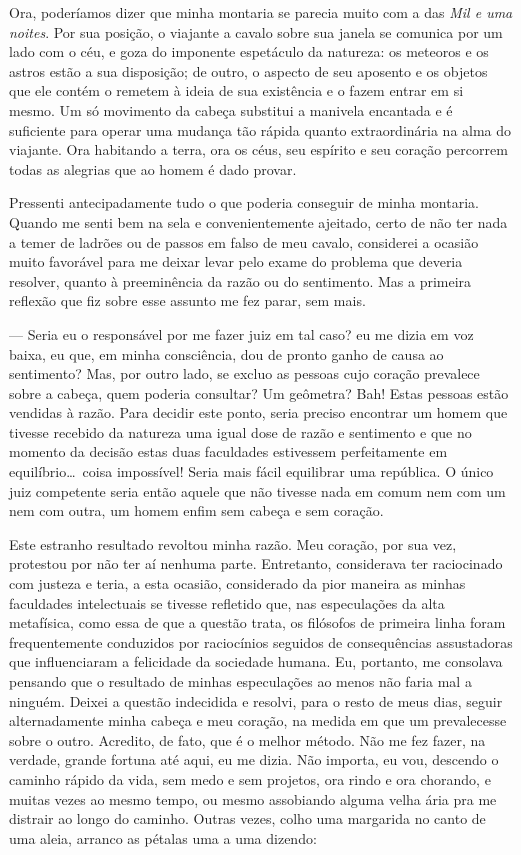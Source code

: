  Ora, poderíamos dizer que minha montaria se parecia muito com a das
\textit{Mil e uma noites}. Por sua posição, o viajante a cavalo sobre
sua janela se comunica por um lado com o céu, e goza do imponente
espetáculo da natureza: os meteoros e os astros estão a sua disposição;
de outro, o aspecto de seu aposento e os objetos que ele contém o
remetem à ideia de sua existência e o fazem entrar em si mesmo. Um só
movimento da cabeça substitui a manivela encantada e é suficiente para
operar uma mudança tão rápida quanto extraordinária na alma do
viajante. Ora habitando a terra, ora os céus, seu espírito e seu
coração percorrem todas as alegrias que ao homem é dado provar.

 Pressenti antecipadamente tudo o que poderia conseguir de minha
montaria. Quando me senti bem na sela e convenientemente ajeitado,
certo de não ter nada a temer de ladrões ou de passos em falso de meu
cavalo, considerei a ocasião muito favorável para me deixar levar pelo
exame do problema que deveria resolver, quanto à preeminência da razão
ou do sentimento. Mas a primeira reflexão que fiz sobre esse assunto me
fez parar, sem mais. 

--- Seria eu o responsável por me fazer juiz em tal caso? eu me dizia em
voz baixa, eu que, em minha consciência, dou de pronto ganho de causa
ao sentimento? Mas, por outro lado, se excluo as pessoas cujo coração
prevalece sobre a cabeça, quem poderia consultar? Um geômetra? Bah!
Estas pessoas estão vendidas à razão. Para decidir este ponto, seria
preciso encontrar um homem que tivesse recebido da natureza uma igual
dose de razão e sentimento e que no momento da decisão estas duas
faculdades estivessem perfeitamente em equilíbrio\ldots\ coisa impossível!
Seria mais fácil equilibrar uma república. O único juiz competente
seria então aquele que não tivesse nada em comum nem com um nem com
outra, um homem enfim sem cabeça e sem coração.

Este estranho resultado revoltou minha razão. Meu coração, por sua vez,
protestou por não ter aí nenhuma parte. Entretanto, considerava ter
raciocinado com justeza e teria, a esta ocasião, considerado da pior
maneira as minhas faculdades intelectuais se tivesse refletido que, nas
especulações da alta metafísica, como essa de que a questão trata, os
filósofos de primeira linha foram frequentemente conduzidos por
raciocínios seguidos de consequências assustadoras que influenciaram a
felicidade da sociedade humana. Eu, portanto, me consolava pensando que
o resultado de minhas especulações ao menos não faria mal a ninguém.
Deixei a questão indecidida e resolvi, para o resto de meus dias,
seguir alternadamente minha cabeça e meu coração, na medida em que um
prevalecesse sobre o outro. Acredito, de fato, que é o melhor método.
Não me fez fazer, na verdade, grande fortuna até aqui, eu me dizia. Não
importa, eu vou, descendo o caminho rápido da vida, sem medo e sem
projetos, ora rindo e ora chorando, e muitas vezes ao mesmo tempo, ou
mesmo assobiando alguma velha ária pra me distrair ao longo do caminho.
Outras vezes, colho uma margarida no canto de uma aleia, arranco as
pétalas uma a uma dizendo: 

